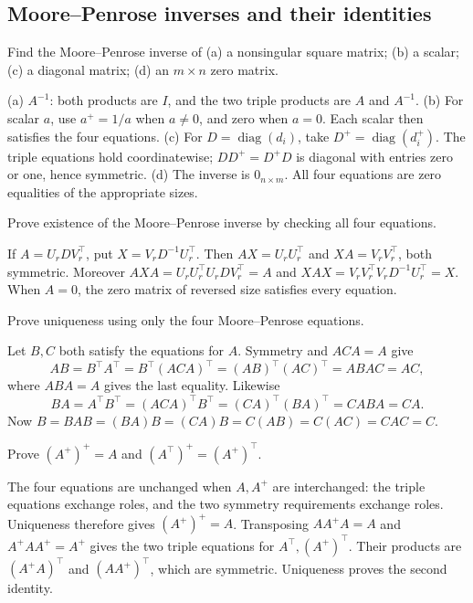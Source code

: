 \subsection*{Moore--Penrose inverses and their identities}

\begin{problem}\label{ex:10:mp-basic}
Find the Moore--Penrose inverse of (a) a nonsingular square matrix;
(b) a scalar; (c) a diagonal matrix; (d) an \(m\times n\) zero matrix.
\end{problem}
\begin{solution}
(a) \(A^{-1}\): both products are \(I\), and the two triple products
are \(A\) and \(A^{-1}\).
(b) For scalar \(a\), use \(a^+=1/a\) when \(a\ne0\), and zero when
\(a=0\). Each scalar then satisfies the four equations.
(c) For \(D=\operatorname{diag}(d_i)\), take
\(D^+=\operatorname{diag}(d_i^+)\). The triple equations hold coordinatewise;
\(DD^+=D^+D\) is diagonal with entries zero or one, hence symmetric.
(d) The inverse is \(0_{n\times m}\). All four equations are zero
equalities of the appropriate sizes.
\end{solution}

\begin{problem}\label{ex:10:mp-existence}
Prove existence of the Moore--Penrose inverse by checking all four equations.
\end{problem}
\begin{solution}
If \(A=U_rDV_r^\top\), put \(X=V_rD^{-1}U_r^\top\).
Then \(AX=U_rU_r^\top\) and \(XA=V_rV_r^\top\), both symmetric.
Moreover
\(AXA=U_rU_r^\top U_rDV_r^\top=A\) and
\(XAX=V_rV_r^\top V_rD^{-1}U_r^\top=X\).
When \(A=0\), the zero matrix of reversed size satisfies every equation.
\end{solution}

\begin{problem}\label{ex:10:mp-uniqueness}
Prove uniqueness using only the four Moore--Penrose equations.
\end{problem}
\begin{solution}
Let \(B,C\) both satisfy the equations for \(A\).
Symmetry and \(ACA=A\) give
\[
AB=B^\top A^\top=B^\top(ACA)^\top
=(AB)^\top(AC)^\top=ABAC=AC,
\]
where \(ABA=A\) gives the last equality. Likewise
\[
BA=A^\top B^\top=(ACA)^\top B^\top
=(CA)^\top(BA)^\top=CABA=CA.
\]
Now \(B=BAB=(BA)B=(CA)B=C(AB)=C(AC)=CAC=C\).
\end{solution}

\begin{problem}\label{ex:10:mp-transpose}
Prove \((A^+)^+=A\) and \((A^\top)^+=(A^+)^\top\).
\end{problem}
\begin{solution}
The four equations are unchanged when \(A,A^+\) are interchanged:
the triple equations exchange roles, and the two symmetry requirements
exchange roles. Uniqueness therefore gives \((A^+)^+=A\).
Transposing \(AA^+A=A\) and \(A^+AA^+=A^+\) gives the two triple
equations for \(A^\top,(A^+)^\top\).
Their products are \((A^+A)^\top\) and \((AA^+)^\top\), which are
symmetric. Uniqueness proves the second identity.
\end{solution}

